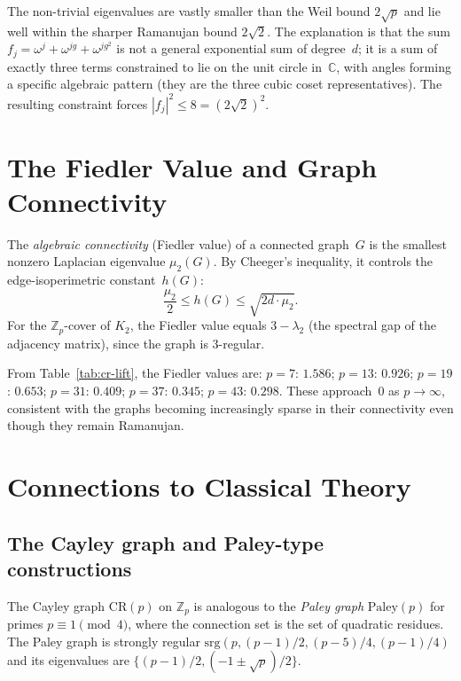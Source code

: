 \documentclass[11pt,a4paper]{article}
\theoremstyle{plain}
\theoremstyle{definition}
\theoremstyle{remark}
\newcommand{\Z}{\mathbb{Z}}
\newcommand{\C}{\mathbb{C}}
\newcommand{\CR}{\mathrm{CR}}
\begin{document}
The non-trivial eigenvalues are vastly smaller than the Weil bound $2\sqrt{p}$
and lie well within the sharper Ramanujan bound $2\sqrt{2}$. The explanation
is that the sum $f_j = \omega^j + \omega^{jg} + \omega^{jg^2}$ is not a
general exponential sum of degree~$d$; it is a sum of exactly three terms
constrained to lie on the unit circle in~$\C$, with angles forming a
specific algebraic pattern (they are the three cubic coset representatives).
The resulting constraint forces $|f_j|^2 \le 8 = (2\sqrt{2})^2$.


\section{The Fiedler Value and Graph Connectivity}
\label{sec:fiedler}

The \emph{algebraic connectivity} (Fiedler value) of a connected graph~$G$
is the smallest nonzero Laplacian eigenvalue $\mu_2(G)$. By Cheeger's
inequality, it controls the edge-isoperimetric constant~$h(G)$:
\[
  \frac{\mu_2}{2} \le h(G) \le \sqrt{2d \cdot \mu_2}.
\]
For the $\Z_p$-cover of $K_2$, the Fiedler value equals $3 - \lambda_2$
(the spectral gap of the adjacency matrix), since the graph is 3-regular.

From Table~\ref{tab:cr-lift}, the Fiedler values are:
$p=7$: $1.586$; $p=13$: $0.926$; $p=19$: $0.653$; $p=31$: $0.409$;
$p=37$: $0.345$; $p=43$: $0.298$. These approach~0 as $p \to \infty$,
consistent with the graphs becoming increasingly sparse in their connectivity
even though they remain Ramanujan.


\section{Connections to Classical Theory}
\label{sec:connections}

\subsection{The Cayley graph and Paley-type constructions}

The Cayley graph $\CR(p)$ on $\Z_p$ is analogous to the \emph{Paley graph}
$\mathrm{Paley}(p)$ for primes $p \equiv 1 \pmod{4}$, where the connection
set is the set of quadratic residues. The Paley graph is strongly regular
$\mathrm{srg}(p, (p-1)/2, (p-5)/4, (p-1)/4)$ and its eigenvalues are
$\{(p-1)/2, (-1 \pm \sqrt{p})/2\}$.
\end{document}
